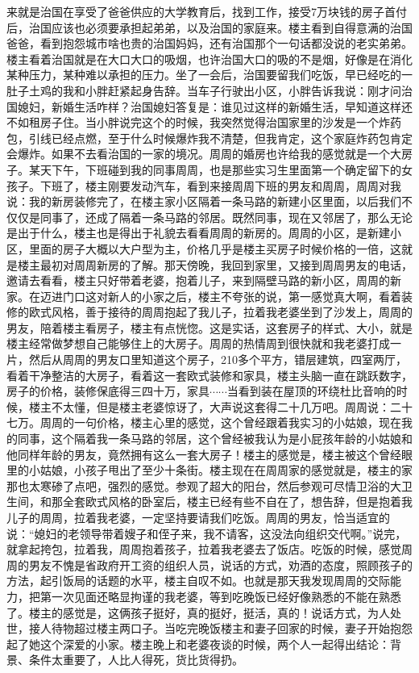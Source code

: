 来就是治国在享受了爸爸供应的大学教育后，找到工作，接受7万块钱的房子首付后，治国应该也必须要承担起弟弟，以及治国的家庭来。楼主看到自得意满的治国爸爸，看到抱怨城市啥也贵的治国妈妈，还有治国那个一句话都没说的老实弟弟。楼主看着治国就是在大口大口的吸烟，也许治国大口的吸的不是烟，好像是在消化某种压力，某种难以承担的压力。坐了一会后，治国要留我们吃饭，早已经吃的一肚子土鸡的我和小胖赶紧起身告辞。当车子行驶出小区，小胖告诉我说：刚才问治国媳妇，新婚生活咋样？治国媳妇答复是：谁见过这样的新婚生活，早知道这样还不如租房子住。当小胖说完这个的时候，我突然觉得治国家里的沙发是一个炸药包，引线已经点燃，至于什么时候爆炸我不清楚，但我肯定，这个家庭炸药包肯定会爆炸。如果不去看治国的一家的境况。周周的婚房也许给我的感觉就是一个大房子。某天下午，下班碰到我的同事周周，也是那些实习生里面第一个确定留下的女孩子。下班了，楼主刚要发动汽车，看到来接周周下班的男友和周周，周周对我说：我的新房装修完了，在楼主家小区隔着一条马路的新建小区里面，以后我们不仅仅是同事了，还成了隔着一条马路的邻居。既然同事，现在又邻居了，那么无论是出于什么，楼主也是得出于礼貌去看看周周的新房的。周周的小区，是新建小区，里面的房子大概以大户型为主，价格几乎是楼主买房子时候价格的一倍，这就是楼主最初对周周新房的了解。那天傍晚，我回到家里，又接到周周男友的电话，邀请去看看，楼主只好带着老婆，抱着儿子，来到隔壁马路的新小区，周周的新家。在迈进门口这对新人的小家之后，楼主不夸张的说，第一感觉真大啊，看着装修的欧式风格，善于接待的周周抱起了我儿子，拉着我老婆坐到了沙发上，周周的男友，陪着楼主看房子，楼主有点恍惚。这是实话，这套房子的样式、大小，就是楼主经常做梦想自己能够住上的大房子。周周的热情周到很快就和我老婆打成一片，然后从周周的男友口里知道这个房子，210多个平方，错层建筑，四室两厅，看着干净整洁的大房子，看着这一套欧式装修和家具，楼主头脑一直在跳跃数字，房子的价格，装修保底得三四十万，家具$\cdots\cdots$当看到装在屋顶的环绕杜比音响的时候，楼主不太懂，但是楼主老婆惊讶了，大声说这套得二十几万吧。周周说：二十七万。周周的一句价格，楼主心里的感觉，这个曾经跟着我实习的小姑娘，现在我的同事，这个隔着我一条马路的邻居，这个曾经被我认为是小屁孩年龄的小姑娘和他同样年龄的男友，竟然拥有这么一套大房子！楼主的感觉是，楼主被这个曾经眼里的小姑娘，小孩子甩出了至少十条街。楼主现在在周周家的感觉就是，楼主的家那也太寒碜了点吧，强烈的感觉。参观了超大的阳台，然后参观可尽情卫浴的大卫生间，和那全套欧式风格的卧室后，楼主已经有些不自在了，想告辞，但是抱着我儿子的周周，拉着我老婆，一定坚持要请我们吃饭。周周的男友，恰当适宜的说：“媳妇的老领导带着嫂子和侄子来，我不请客，这没法向组织交代啊。”说完，就拿起挎包，拉着我，周周抱着孩子，拉着我老婆去了饭店。吃饭的时候，感觉周周的男友不愧是省政府开工资的组织人员，说话的方式，劝酒的态度，照顾孩子的方法，起引饭局的话题的水平，楼主自叹不如。也就是那天我发现周周的交际能力，把第一次见面还略显拘谨的我老婆，等到吃晚饭已经好像熟悉的不能在熟悉了。楼主的感觉是，这俩孩子挺好，真的挺好，挺活，真的！说话方式，为人处世，接人待物超过楼主两口子。当吃完晚饭楼主和妻子回家的时候，妻子开始抱怨起了她这个深爱的小家。楼主晚上和老婆夜谈的时候，两个人一起得出结论：背景、条件太重要了，人比人得死，货比货得扔。

